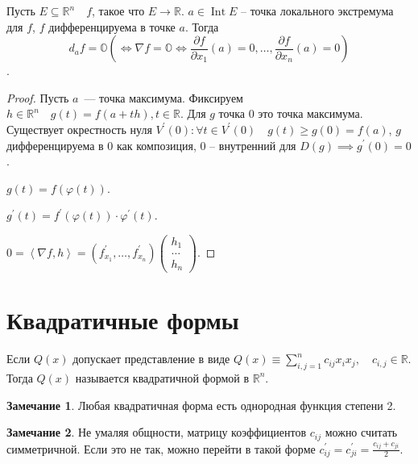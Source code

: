 \documentclass{book}
\newcommand\R{\ensuremath{\mathbb{R}}}
\newcommand{\p}[1]{#1^{\prime}}
\theoremstyle{definition}
\newtheorem*{note}{Замечание}
\DeclareMathOperator{\Int}{Int}
\begin{document}
        \begin{statement}
            Пусть $E \subseteq \R^n\quad f$, такое что $E\to \R$.
            $a\in \Int E$ -- точка локального экстремума для  $f$, $f$ дифференцируема в точке  $a$.
        Тогда  \[d_af = \mathbb{O} \left( \iff  \nabla f = \mathbb O \iff  \frac{\partial f}{\partial x_1}(a) = 0, \ldots, \frac{\partial f}{\partial x_{n} }(a) = 0\right) \].
        \end{statement}
        \begin{proof}
            Пусть $a$~--- точка максимума. 
            Фиксируем $h\in \R^n\quad g(t) = f(a + th), t\in \R.$ 
            Для $g$ точка 0 это точка максимума.
            Существует окрестность нуля $\p V(0): \forall t\in \p V(0)\quad g(t) \geqslant  g(0) = f(a)$, $g$ дифференцируема в 0 как композиция, 0 -- внутренний для  $D(g) \implies \p g(0) = 0$.

            $g(t) = f\left( \varphi(t) \right)$.

            $\p g(t)  =\p f\left( \varphi(t) \right) \cdot \p \varphi(t)$.

            $0 = \left<\nabla f, h  \right> = \left( \p f_{x_1}, \ldots, \p f_{x_{n} } \right) \begin{pmatrix} h_1\\\ldots\\ h_n \end{pmatrix}$.
        \end{proof}
            
        \section{Квадратичные формы}
        Если $Q(x)$ допускает представление в виде  $ Q(x) \equiv \sum_{i, j=1}^{n} c_{ij}x_i x_j, \quad c_{i, j}\in \R$. 
        Тогда $Q(x)$ называется квадратичной формой в  $\R^n$.

        \begin{note}
            Любая квадратичная форма есть однородная функция степени 2.
        \end{note}
        \begin{note}
            Не умаляя общности, матрицу коэффициентов $c_{ij}$ можно считать симметричной.
            Если это не так, можно перейти в такой форме  $\p c_{ij} = \p c_{ji} = \frac{c_{ij} + c_{ji}}{2}$.
        \end{note}
\end{document}
